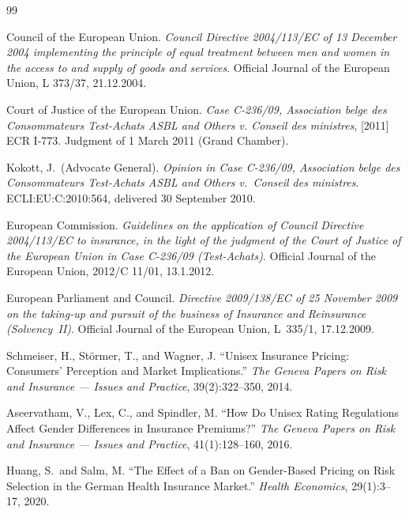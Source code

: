 \documentclass[12pt,a4paper]{article}
\begin{document}
\begin{thebibliography}{99}\sloppy

Council of the European Union.
\emph{Council Directive 2004/113/EC of 13 December 2004 implementing the principle of
equal treatment between men and women in the access to and supply of goods and services}.
Official Journal of the European Union, L 373/37, 21.12.2004.

Court of Justice of the European Union.
\emph{Case C-236/09, Association belge des Consommateurs Test-Achats ASBL and Others v.
Conseil des ministres}, [2011] ECR I-773.
Judgment of 1 March 2011 (Grand Chamber).

Kokott, J.\ (Advocate General).
\emph{Opinion in Case C-236/09, Association belge des Consommateurs Test-Achats ASBL
and Others v.\ Conseil des ministres}.
ECLI:EU:C:2010:564, delivered 30 September 2010.

European Commission.
\emph{Guidelines on the application of Council Directive 2004/113/EC to insurance, in the
light of the judgment of the Court of Justice of the European Union in Case C-236/09
(Test-Achats)}.
Official Journal of the European Union, 2012/C 11/01, 13.1.2012.

European Parliament and Council.
\emph{Directive 2009/138/EC of 25 November 2009 on the taking-up and pursuit of the
business of Insurance and Reinsurance (Solvency~II)}.
Official Journal of the European Union, L~335/1, 17.12.2009.

Schmeiser, H., St\"{o}rmer, T., and Wagner, J.
``Unisex Insurance Pricing: Consumers' Perception and Market Implications.''
\emph{The Geneva Papers on Risk and Insurance --- Issues and Practice}, 39(2):322--350, 2014.

Aseervatham, V., Lex, C., and Spindler, M.
``How Do Unisex Rating Regulations Affect Gender Differences in Insurance Premiums?''
\emph{The Geneva Papers on Risk and Insurance --- Issues and Practice}, 41(1):128--160, 2016.

Huang, S.\ and Salm, M.
``The Effect of a Ban on Gender-Based Pricing on Risk Selection in the German
Health Insurance Market.''
\emph{Health Economics}, 29(1):3--17, 2020.


\end{thebibliography}
\end{document}
